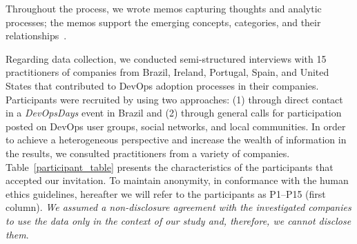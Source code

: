 Throughout the process, we wrote memos capturing thoughts and analytic
processes; the memos support the emerging concepts, categories, and their
relationships~\cite{adolph2012reconciling}.

Regarding data collection, we conducted semi-structured interviews with 15 practitioners of companies from
Brazil, Ireland, Portugal, Spain, and United States that
contributed to DevOps adoption processes in their companies. Participants
were recruited by using two approaches: (1) through direct contact in a \emph{DevOpsDays}
event in Brazil and (2) through general
calls for participation posted on DevOps user groups, social networks,
and local communities. In order to achieve a heterogeneous perspective
and increase the wealth of information in the results,
we consulted practitioners from a variety of companies.
Table~\ref{participant_table} presents the characteristics of the participants
that accepted our invitation.
To maintain anonymity, in conformance with the human ethics guidelines,
hereafter we will refer to the participants as P1--P15 (first column). \emph{We
assumed a non-disclosure agreement with the investigated companies to use the
data only in the context of our study and, therefore, we cannot disclose them}.

